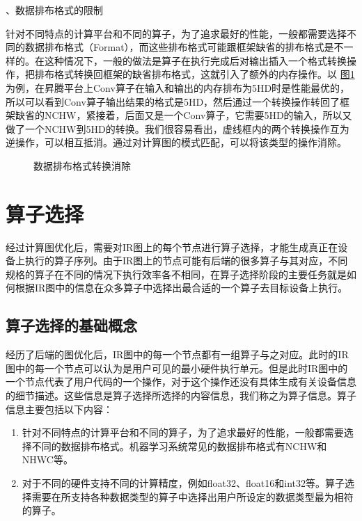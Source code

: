 \documentclass[letterpaper,10pt,english]{sphinxmanual}
\let\sphinxpxdimen\pdfpxdimen\else\newdimen\sphinxpxdimen
\begin{document}
、数据排布格式的限制

\sphinxAtStartPar
针对不同特点的计算平台和不同的算子，为了追求最好的性能，一般都需要选择不同的数据排布格式（Format），而这些排布格式可能跟框架缺省的排布格式是不一样的。在这种情况下，一般的做法是算子在执行完成后对输出插入一个格式转换操作，把排布格式转换回框架的缺省排布格式，这就引入了额外的内存操作。以
\hyperref[\detokenize{chapter_backend_and_runtime/graph_optimizer:transdata}]{图\ref{\detokenize{chapter_backend_and_runtime/graph_optimizer:transdata}}}为例，在昇腾平台上Conv算子在输入和输出的内存排布为5HD时是性能最优的，所以可以看到Conv算子输出结果的格式是5HD，然后通过一个转换操作转回了框架缺省的NCHW，紧接着，后面又是一个Conv算子，它需要5HD的输入，所以又做了一个NCHW到5HD的转换。我们很容易看出，虚线框内的两个转换操作互为逆操作，可以相互抵消。通过对计算图的模式匹配，可以将该类型的操作消除。

\begin{figure}[H]
\centering
\capstart

\noindent\sphinxincludegraphics[width=800\sphinxpxdimen]{{transdata}.png}
\caption{数据排布格式转换消除}\label{\detokenize{chapter_backend_and_runtime/graph_optimizer:id7}}\label{\detokenize{chapter_backend_and_runtime/graph_optimizer:transdata}}\end{figure}


\section{算子选择}
\label{\detokenize{chapter_backend_and_runtime/kernel_selecter:id1}}\label{\detokenize{chapter_backend_and_runtime/kernel_selecter::doc}}
\sphinxAtStartPar
经过计算图优化后，需要对IR图上的每个节点进行算子选择，才能生成真正在设备上执行的算子序列。由于IR图上的节点可能有后端的很多算子与其对应，不同规格的算子在不同的情况下执行效率各不相同，在算子选择阶段的主要任务就是如何根据IR图中的信息在众多算子中选择出最合适的一个算子去目标设备上执行。


\subsection{算子选择的基础概念}
\label{\detokenize{chapter_backend_and_runtime/kernel_selecter:id2}}
\sphinxAtStartPar
经历了后端的图优化后，IR图中的每一个节点都有一组算子与之对应。此时的IR图中的每一个节点可以认为是用户可见的最小硬件执行单元。但是此时IR图中的一个节点代表了用户代码的一个操作，对于这个操作还没有具体生成有关设备信息的细节描述。这些信息是算子选择所选择的内容信息，我们称之为算子信息。算子信息主要包括以下内容：
\begin{enumerate}
%
\item {} 
\sphinxAtStartPar
针对不同特点的计算平台和不同的算子，为了追求最好的性能，一般都需要选择不同的数据排布格式。机器学习系统常见的数据排布格式有NCHW和NHWC等。

\item {} 
\sphinxAtStartPar
对于不同的硬件支持不同的计算精度，例如float32、float16和int32等。算子选择需要在所支持各种数据类型的算子中选择出用户所设定的数据类型最为相符的算子。

\end{enumerate}
\end{document}
